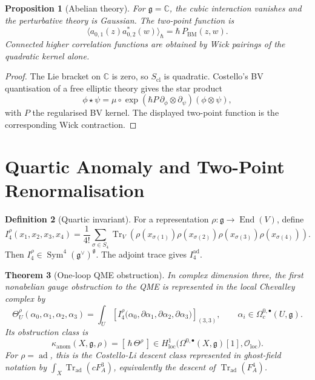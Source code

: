 \documentclass[11pt]{amsart}
\providecommand{\C}{\mathbb{C}}
\providecommand{\fg}{\mathfrak{g}}
\providecommand{\ad}{\operatorname{ad}}
\providecommand{\Tr}{\operatorname{Tr}}
\providecommand{\Sym}{\operatorname{Sym}}
\providecommand{\End}{\operatorname{End}}
\providecommand{\cO}{\mathcal{O}}
\providecommand{\kanom}{\kappa_{\operatorname{anom}}}
\theoremstyle{plain}
\newtheorem{theorem}{Theorem}[section]
\newtheorem{proposition}[theorem]{Proposition}
\theoremstyle{definition}
\newtheorem{definition}[theorem]{Definition}
\theoremstyle{remark}
\begin{document}
\begin{proposition}[Abelian theory]
\label{prop:abelian-theory}
For \(\fg=\C\), the cubic interaction vanishes and the perturbative
theory is Gaussian. The two-point function is
\[
  \langle a_{0,1}(z)a^\ast_{0,2}(w)\rangle_\hbar
  =
  \hbar\,P_{\mathrm{BM}}(z,w).
\]
Connected higher correlation functions are obtained by Wick pairings
of the quadratic kernel alone.
\end{proposition}

\begin{proof}
The Lie bracket on \(\C\) is zero, so \(S_{\mathrm{cl}}\) is quadratic.
Costello's BV quantisation of a free elliptic theory gives the star
product
\[
  \phi\star\psi
  =
  \mu\circ\exp(\hbar P\,\partial_\phi\otimes\partial_\psi)
  (\phi\otimes\psi),
\]
with \(P\) the regularised BV kernel. The displayed two-point function
is the corresponding Wick contraction.
\end{proof}

\section{Quartic Anomaly and Two-Point Renormalisation}
\label{sec:quartic-anomaly}

\begin{definition}[Quartic invariant]
\label{def:quartic-invariant}
For a representation \(\rho:\fg\to\End(V)\), define
\[
  I_4^\rho(x_1,x_2,x_3,x_4)
  =
  \frac1{4!}\sum_{\sigma\in S_4}
  \Tr_V\!\left(
    \rho(x_{\sigma(1)})\rho(x_{\sigma(2)})
    \rho(x_{\sigma(3)})\rho(x_{\sigma(4)})
  \right).
\]
Then \(I_4^\rho\in\Sym^4(\fg^\vee)^\fg\). The adjoint trace gives
\(I_4^{\ad}\).
\end{definition}

\begin{theorem}[One-loop QME obstruction]
\label{thm:quartic-obstruction}
In complex dimension three, the first nonabelian gauge obstruction to
the QME is represented in the local Chevalley complex by
\[
  \Theta^\rho_U(\alpha_0,\alpha_1,\alpha_2,\alpha_3)
  =
  \int_U
  \left[
  I_4^\rho\bigl(
    \alpha_0,\partial\alpha_1,\partial\alpha_2,\partial\alpha_3
  \bigr)
  \right]_{(3,3)},
  \qquad
  \alpha_i\in\Omega^{0,\bullet}_c(U,\fg).
\]
Its obstruction class is
\[
  \kanom(X,\fg,\rho)
  =
  [\,\hbar\,\Theta^\rho\,]
  \in
  H^1_{\mathrm{loc}}
  \bigl(\Omega^{0,\bullet}(X,\fg)[1],\cO_{\mathrm{loc}}\bigr).
\]
For \(\rho=\ad\), this is the Costello-Li descent class represented in
ghost-field notation by \(\int_X\Tr_{\ad}(cF_A^3)\), equivalently the
descent of \(\Tr_{\ad}(F_A^4)\).
\end{theorem}
\end{document}
